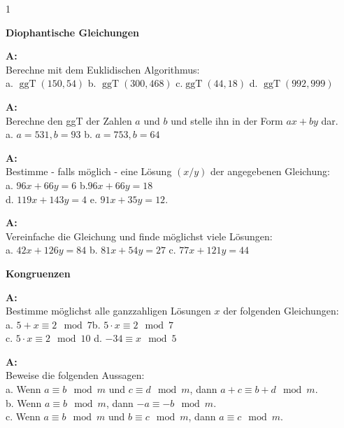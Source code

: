 \documentclass[landscape,twocolumn,a4paper]{article}
\begin{document}
\newcommand{\ggT}{\operatorname{ggT}}
\newcommand{\Mod}[3]{#1\equiv#2\mod#3}
\newcommand\x{1}
\setcounter {y} {1}

\parindent 0mm



\textbf{Diophantische Gleichungen} 
\bigskip

 
\textbf{A:}   \\
Berechne mit dem Euklidischen Algorithmus: \\
a.  $\ggT(150,54)$ \quad b. $\ggT(300,468)$ \quad 
 c.$\ggT(44,18)$ \quad d. $\ggT(992,999)$
\bigskip {}
 
\textbf{A:}   \\
Berechne den ggT der Zahlen $a$ und $b$ und stelle ihn in der Form $ax + by$ dar. \\
a.   $ a = 531, b = 93$  \quad b. $ a = 753, b = 64$
\bigskip {}

\textbf{A:}   \\
Bestimme - falls möglich - eine Lösung $(x/y)$ der angegebenen Gleichung: \\
a.  $96x+66y=6$ \quad b.$96x+66y=18$ \\
d.  $119x+143y=4$ \quad e. $91x+35y=12$.
\bigskip {}
 
 
 \textbf{A:}   \\
Vereinfache die Gleichung und finde möglichst viele Lösungen: \\
a.   $42x+126y=84$ \quad b. $81x+54y=27$ \quad 
 c. $77x+121y=44$ 
 \bigskip {}

 
 \textbf{Kongruenzen} \bigskip
 
\textbf{A:}   \\
Bestimme möglichst alle ganzzahligen Lösungen $x$ der folgenden
  Gleichungen: \\
a. $\Mod{5+x}{2}{7}$\quad b.   $\Mod{5\cdot x}{2}{7}$ \\ 
c. $\Mod{5\cdot x}{2}{10}$  \quad d.  $\Mod{-34}{x}{5}$
\bigskip {}

\textbf{A:}   \\
Beweise die folgenden Aussagen:\\
a. Wenn $\Mod{a}{b}{m}$ und $\Mod{c}{d}{m}$, dann
    $\Mod{a+c}{b+d}{m}$. \\
b. Wenn $\Mod{a}{b}{m}$, dann $\Mod{-a}{-b}{m}$. \\
c. Wenn $\Mod{a}{b}{m}$ und $\Mod{b}{c}{m}$, dann
    $\Mod{a}{c}{m}$.
\bigskip {}
\end{document}
